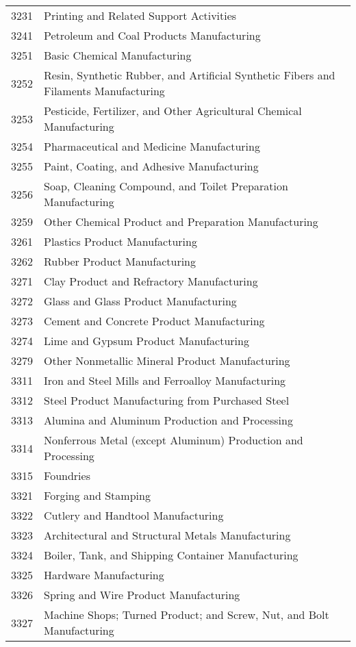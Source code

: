 \documentclass[11pt]{article}
\begin{document}
\begin{spacing}{1}
\begin{table}[ht]
\begin{tabular} { ll }
3231   &  Printing and Related Support Activities \\
3241   &  Petroleum and Coal Products Manufacturing \\
3251   &  Basic Chemical Manufacturing \\
3252   &  Resin, Synthetic Rubber, and Artificial Synthetic Fibers and Filaments Manufacturing \\
3253   &  Pesticide, Fertilizer, and Other Agricultural Chemical Manufacturing \\
3254   &  Pharmaceutical and Medicine Manufacturing \\
3255   &  Paint, Coating, and Adhesive Manufacturing \\
3256   &  Soap, Cleaning Compound, and Toilet Preparation Manufacturing \\
3259   &  Other Chemical Product and Preparation Manufacturing \\
3261   &  Plastics Product Manufacturing \\
3262   &  Rubber Product Manufacturing \\
3271   &  Clay Product and Refractory Manufacturing \\
3272   &  Glass and Glass Product Manufacturing \\
3273   &  Cement and Concrete Product Manufacturing \\
3274   &  Lime and Gypsum Product Manufacturing \\
3279   &  Other Nonmetallic Mineral Product Manufacturing \\
3311   &  Iron and Steel Mills and Ferroalloy Manufacturing \\
3312   &  Steel Product Manufacturing from Purchased Steel \\
3313   &  Alumina and Aluminum Production and Processing \\
3314   &  Nonferrous Metal (except Aluminum) Production and Processing \\
3315   &  Foundries \\
3321   &  Forging and Stamping \\
3322   &  Cutlery and Handtool Manufacturing \\
3323   &  Architectural and Structural Metals Manufacturing \\
3324   &  Boiler, Tank, and Shipping Container Manufacturing \\
3325   &  Hardware Manufacturing \\
3326   &  Spring and Wire Product Manufacturing \\
3327   &  Machine Shops; Turned Product; and Screw, Nut, and Bolt Manufacturing \\

\end{tabular}
\end{table}
\end{spacing}
\end{document}
